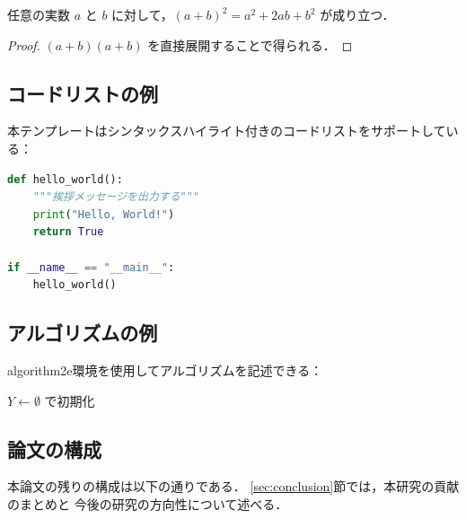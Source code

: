 \begin{theorem}
\label{thm:example}
任意の実数 $a$ と $b$ に対して，$(a + b)^2 = a^2 + 2ab + b^2$ が成り立つ．
\end{theorem}

\begin{proof}
$(a + b)(a + b)$ を直接展開することで得られる．
\end{proof}

\subsection{コードリストの例}

本テンプレートはシンタックスハイライト付きのコードリストをサポートしている：

\begin{lstlisting}[language=Python, caption={Pythonコードの例}]
def hello_world():
    """挨拶メッセージを出力する"""
    print("Hello, World!")
    return True

if __name__ == "__main__":
    hello_world()
\end{lstlisting}

\subsection{アルゴリズムの例}

algorithm2e環境を使用してアルゴリズムを記述できる：

\begin{algorithm}[t]
\caption{アルゴリズムの例}
\label{alg:example}
$Y \leftarrow \emptyset$ で初期化\;
\end{algorithm}

\subsection{論文の構成}

本論文の残りの構成は以下の通りである．
\ref{sec:conclusion}節では，本研究の貢献のまとめと
今後の研究の方向性について述べる．
